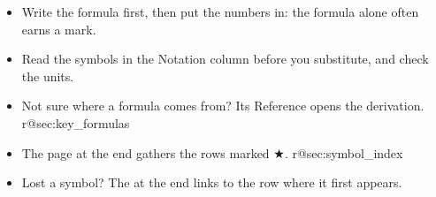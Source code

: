 \thispagestyle{empty}
\newcommand{\coversamplerow}[4]{%
	\bocsection{How to read a row}
	\begin{tikzpicture}[lab/.style={font=\small, text=CoverSoft, align=center}, cell/.style={draw=black!30, minimum height=1.3cm, align=center, inner sep=4pt}]
		\node[cell, fill=gray!6, text width=3.0cm] (t) at (0,0) {\covbf{#1}};
		\node[cell, text width=5.6cm, right=0pt of t] (e) {#2};
		\node[cell, text width=4.6cm, right=0pt of e, font=\small] (n) {#3};
		\node[cell, text width=2.3cm, right=0pt of n, font=\small] (r) {#4};
		\path (e.north) -- (t.north);
		\foreach \x/\s in {t/{the name you\\search for}, e/{the formula,\\exactly as derived}, n/{every new symbol\\with its unit}, r/{link: opens the\\derivation}} {
			\draw[-{Latex}, CoverSig] ($(\x.south)+(0,-0.75)$) -- (\x.south);
			\node[lab, below=0.8cm of \x.south, anchor=north] {\s};}
	\end{tikzpicture}\par\vspace{0.8cm}}
\CoverSampleRow
{}
\begin{itemize}\setlength\itemsep{3pt}
\item Write the formula first, then put the numbers in: the formula alone often earns a mark.
\item Read the symbols in the Notation column before you substitute, and check the units.
\item Not sure where a formula comes from? Its Reference opens the derivation.
\ifcsname r@sec:key_formulas\endcsname\item The \hyperref[sec:key_formulas]{} page at the end gathers the
	rows marked {\color{orange!80!black}$\bigstar$}.\fi
\ifcsname r@sec:symbol_index\endcsname\item Lost a symbol? The \hyperref[sec:symbol_index]{} at the end
	links to the row where it first appears.\fi
\end{itemize}
\bocinfo
\clearpage

